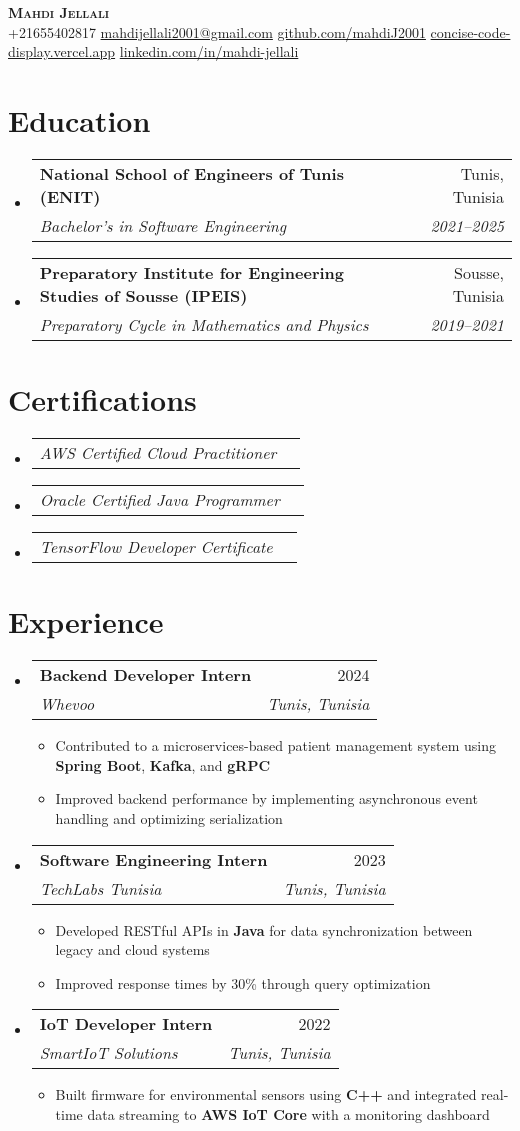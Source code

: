\documentclass[letterpaper,11pt]{article}
\makeatletter
\newcommand{\resumeItem}[1]{
    \item\small{
            {#1 \vspace{-2pt}}
    }
}
\newcommand{\resumeSubheading}[4]{
    \vspace{-2pt}\item
    \begin{tabular*}{0.97\textwidth}[t]{l@{\extracolsep{\fill}}r}
    \textbf{#1} & #2 \\
    \textit{\small#3} & \textit{\small #4} \\
    \end{tabular*}\vspace{-7pt}
}
\newcommand{\resumeSubSubheading}[2]{
    \item
    \begin{tabular*}{0.97\textwidth}{l@{\extracolsep{\fill}}r}
    \textit{\small#1} & \textit{\small #2} \\
    \end{tabular*}\vspace{-7pt}
}
\newcommand{\resumeSubHeadingListStart}{\begin{itemize}[leftmargin=0.15in, label={}]}
\newcommand{\resumeSubHeadingListEnd}{\end{itemize}}
\newcommand{\resumeItemListStart}{\begin{itemize}}
\newcommand{\resumeItemListEnd}{\end{itemize}\vspace{-5pt}}
\makeatother
\begin{document}
\begin{center}
\textbf{\Huge \scshape Mahdi Jellali} \\ \vspace{1pt}
\small
+21655402817 \quad
\href{mailto:mahdijellali2001@gmail.com}{mahdijellali2001@gmail.com} \quad
\href{https://github.com/mahdiJ2001}{github.com/mahdiJ2001} \quad
\href{https://concise-code-display.vercel.app/}{concise-code-display.vercel.app} \quad
\href{https://www.linkedin.com/in/mahdi-jellali/}{linkedin.com/in/mahdi-jellali}
\end{center}

\vspace{10pt}
\section{Education}
\resumeSubHeadingListStart
\resumeSubheading
{National School of Engineers of Tunis (ENIT)}{Tunis, Tunisia}
{Bachelor’s in Software Engineering}{2021–2025}
\resumeSubheading
{Preparatory Institute for Engineering Studies of Sousse (IPEIS)}{Sousse, Tunisia}
{Preparatory Cycle in Mathematics and Physics}{2019–2021}
\resumeSubHeadingListEnd
\section{Certifications}
\resumeSubHeadingListStart
\resumeSubSubheading
{AWS Certified Cloud Practitioner}{}
\resumeSubSubheading
{Oracle Certified Java Programmer}{}
\resumeSubSubheading
{TensorFlow Developer Certificate}{}
\resumeSubHeadingListEnd

\section{Experience}
\resumeSubHeadingListStart
\resumeSubheading
{Backend Developer Intern}{2024}
{Whevoo}{Tunis, Tunisia}
\resumeItemListStart
\resumeItem{Contributed to a microservices-based patient management system using \textbf{Spring Boot}, \textbf{Kafka}, and \textbf{gRPC}}
\resumeItem{Improved backend performance by implementing asynchronous event handling and optimizing serialization}
\resumeItemListEnd
\resumeSubheading
{Software Engineering Intern}{2023}
{TechLabs Tunisia}{Tunis, Tunisia}
\resumeItemListStart
\resumeItem{Developed RESTful APIs in \textbf{Java} for data synchronization between legacy and cloud systems}
\resumeItem{Improved response times by 30\% through query optimization}
\resumeItemListEnd
\resumeSubheading
{IoT Developer Intern}{2022}
{SmartIoT Solutions}{Tunis, Tunisia}
\resumeItemListStart
\resumeItem{Built firmware for environmental sensors using \textbf{C++} and integrated real-time data streaming to \textbf{AWS IoT Core} with a monitoring dashboard}
\resumeItemListEnd
\resumeSubHeadingListEnd
\end{document}
